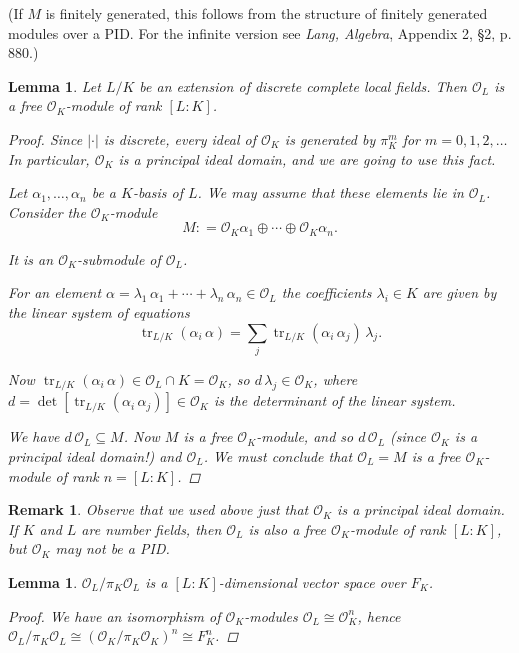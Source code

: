 \documentclass{article}
\newcommand{\isom}{\cong}
\newcommand{\dfn}{\mathrel{\mathop:}=}
\renewcommand{\O}{\mathcal{O}}
\DeclareMathOperator{\tr}{tr}
\theoremstyle{myplain}
\newtheorem{lemma}[proposition]{Lemma}
\theoremstyle{mydefinition}
\newtheorem{remark}[proposition]{Remark}
\begin{document}
\noindent (If $M$ is finitely generated, this follows from the structure of
finitely generated modules over a PID. For the infinite version see
\emph{Lang, Algebra}, Appendix 2, \S 2, p. 880.)

\begin{lemma}
  Let $L/K$ be an extension of discrete complete local fields. Then $\O_L$ is a
  free $\O_K$-module of rank $[L:K]$.

  \begin{proof}
    Since $|\cdot|$ is discrete, every ideal of $\O_K$ is generated by $\pi_K^m$
    for $m = 0, 1, 2, \ldots$ In particular, $\O_K$ is a principal ideal domain,
    and we are going to use this fact.

    Let $\alpha_1, \ldots, \alpha_n$ be a $K$-basis of $L$. We may assume that
    these elements lie in $\O_L$. Consider the $\O_K$-module
    \[ M \dfn \O_K \alpha_1 \oplus \cdots \oplus \O_K \alpha_n. \]

    It is an $\O_K$-submodule of $\O_L$.

    For an element
    $\alpha = \lambda_1 \, \alpha_1 + \cdots + \lambda_n \, \alpha_n \in \O_L$
    the coefficients $\lambda_i \in K$ are given by the linear system of
    equations
    \[ \tr_{L/K} (\alpha_i\,\alpha) = \sum_j \tr_{L/K} (\alpha_i\,\alpha_j)\,\lambda_j. \]

    Now $\tr_{L/K} (\alpha_i\,\alpha) \in \O_L\cap K = \O_K$, so
    $d\,\lambda_j \in \O_K$, where
    $d = \det [\tr_{L/K} (\alpha_i\,\alpha_j)] \in \O_K$ is the determinant of
    the linear system.

    We have $d\,\O_L \subseteq M$. Now $M$ is a free $\O_K$-module, and so
    $d\,\O_L$ (since $\O_K$ is a principal ideal domain!) and $\O_L$. We must
    conclude that $\O_L = M$ is a free $\O_K$-module of rank $n = [L : K]$.
  \end{proof}
\end{lemma}

\begin{remark}
  Observe that we used above just that $\O_K$ is a principal ideal domain.
  If $K$ and $L$ are number fields, then $\O_L$ is also a free $\O_K$-module of
  rank $[L:K]$, but $\O_K$ may not be a PID.
\end{remark}

\begin{lemma}
  $\O_L / \pi_K \O_L$ is a $[L:K]$-dimensional vector space over $F_K$.

  \begin{proof}
    We have an isomorphism of $\O_K$-modules $\O_L \isom \O_K^n$, hence
    $\O_L/\pi_K \O_L \isom (\O_K/\pi_K \O_K)^n \isom F_K^n$.
  \end{proof}
\end{lemma}
\end{document}
